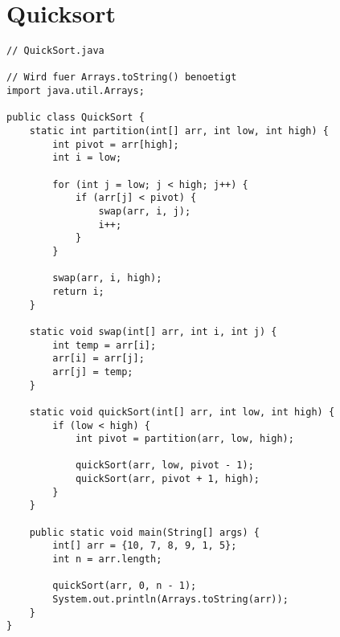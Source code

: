 \section{Quicksort}
\begin{center}
\begin{lstlisting}
// QuickSort.java

// Wird fuer Arrays.toString() benoetigt
import java.util.Arrays;

public class QuickSort {
    static int partition(int[] arr, int low, int high) {
        int pivot = arr[high];
        int i = low;

        for (int j = low; j < high; j++) {
            if (arr[j] < pivot) {
                swap(arr, i, j);
                i++;
            }
        }

        swap(arr, i, high);  
        return i;
    }

    static void swap(int[] arr, int i, int j) {
        int temp = arr[i];
        arr[i] = arr[j];
        arr[j] = temp;
    }

    static void quickSort(int[] arr, int low, int high) {
        if (low < high) {          
            int pivot = partition(arr, low, high);

            quickSort(arr, low, pivot - 1);
            quickSort(arr, pivot + 1, high);
        }
    }

    public static void main(String[] args) {
        int[] arr = {10, 7, 8, 9, 1, 5};
        int n = arr.length;
      
        quickSort(arr, 0, n - 1);
        System.out.println(Arrays.toString(arr));
    }
}
\end{lstlisting}
\end{center}
